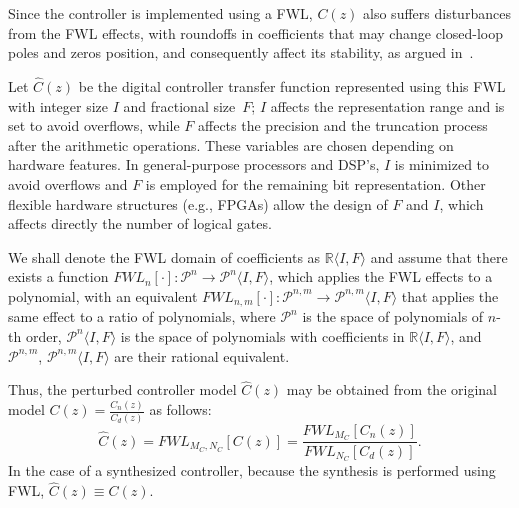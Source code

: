 \documentclass[final]{sig-alternate-05-2015}
\begin{document}
Since the controller is implemented using a FWL, $C(z)$ also suffers
disturbances from the FWL effects, with roundoffs in coefficients that may
change closed-loop poles and zeros position, and consequently affect its
stability, as argued in~\cite{Bessa16}.

Let $\hat{C}(z)$ be the digital controller transfer function
represented using this FWL with integer size $I$ and fractional size~$F$;
$I$ affects the representation range and is set to avoid overflows, 
while $F$ affects the precision and the truncation process after the 
arithmetic operations. These variables are chosen depending on 
hardware features.  In general-purpose processors and
DSP's, $I$ is minimized to avoid overflows and $F$ is employed for the
remaining bit representation. Other flexible hardware structures
(e.g., FPGAs) allow the design of $F$ and $I$, which affects directly
the number of logical gates.

We shall denote the FWL domain of coefficients as $\mathbb{R}\langle I,F
\rangle$
%
%
and assume that there exists a function
$\mathit{FWL}_n[\cdot]:\mathcal{P}^{n}\rightarrow \mathcal{P}^{n}\langle I,F \rangle$,
which applies the FWL effects to a polynomial, with an equivalent $\mathit{FWL}_{n,m}[\cdot]:\mathcal{P}^{n,m}\rightarrow \mathcal{P}^{n,m}\langle I,F \rangle$ that applies the same effect to a ratio of polynomials, where
$\mathcal{P}^{n}$ is the
space of polynomials of $n$-th order, $\mathcal{P}^{n}\langle I,F
\rangle$ is the space of polynomials with coefficients in
$\mathbb{R}\langle I,F \rangle$, and $\mathcal{P}^{n,m}$,  $\mathcal{P}^{n,m}\langle I,F
\rangle$ are their rational equivalent.

Thus, the perturbed controller model $\hat{C}(z)$ may be obtained from the
original model $C(z)=\frac{C_{n}(z)}{C_{d}(z)}$ as follows:
%
\begin{equation}
\hat{C}(z)=\mathit{FWL}_{M_C,N_C}[C(z)]=\frac{\mathit{FWL}_{M_C}[C_n(z)]}{\mathit{FWL}_{N_C}[C_d(z)]}.
\end{equation}
%
In the case of a synthesized controller, because the synthesis is performed
using FWL, $\hat{C}(z) \equiv C(z)$.

%
\end{document}
